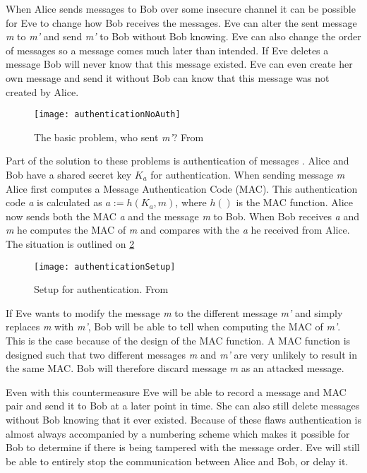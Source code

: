 When Alice sends messages to Bob over some insecure channel it can be possible for Eve to change how Bob receives the messages.
Eve can alter the sent message \emph{m} to \emph{m'} and send \emph{m'} to Bob without Bob knowing.
Eve can also change the order of messages so a message comes much later than intended.
If Eve deletes a message Bob will never know that this message existed.
Eve can even create her own message and send it without Bob can know that this message was not created by Alice.

\begin{figure}[H]
	\centering
	\texttt{[image: authenticationNoAuth]}
	\caption{The basic problem, who sent \emph{m'}? From \citet[p.~52]{cryptoenginering}}
	\label{crypto:noauth}
\end{figure}

Part of the solution to these problems is authentication of messages \citet[p.~52]{cryptoenginering}.
Alice and Bob have a shared secret key $K_a$ for authentication.
When sending message \emph{m} Alice first computes a Message Authentication Code (MAC).
This authentication code \emph{a} is calculated as $a := h(K_a,m)$, where $h()$ is the MAC function.
Alice now sends both the MAC \emph{a} and the message \emph{m} to Bob.
When Bob receives \emph{a} and \emph{m} he computes the MAC of \emph{m} and compares with the \emph{a} he received from Alice.
The situation is outlined on \cref{crypto:authsetup}

\begin{figure}[H]
	\centering
	\texttt{[image: authenticationSetup]}
	\caption{Setup for authentication. From \citet[p.~53]{cryptoenginering}}
	\label{crypto:authsetup}
\end{figure}

If Eve wants to modify the message \emph{m} to the different message \emph{m'} and simply replaces \emph{m} with \emph{m'}, Bob will be able to tell when computing the MAC of \emph{m'}.
This is the case because of the design of the MAC function.
A MAC function is designed such that two different messages \emph{m} and \emph{m'} are very unlikely to result in the same MAC.
Bob will therefore discard message \emph{m} as an attacked message.

Even with this countermeasure Eve will be able to record a message and MAC pair and send it to Bob at a later point in time.
She can also still delete messages without Bob knowing that it ever existed.
Because of these flaws authentication is almost always accompanied by a numbering scheme which makes it possible for Bob to determine if there is being tampered with the message order.
Eve will still be able to entirely stop the communication between Alice and Bob, or delay it.

